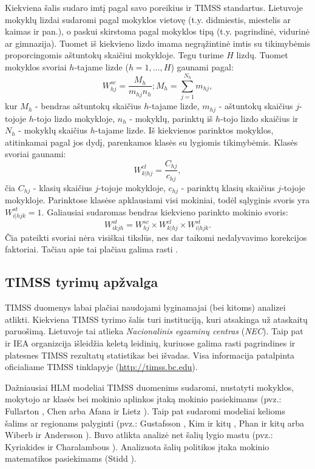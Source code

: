 \documentclass[11pt,a4paper]{article}
\begin{document}
\indent Kiekviena šalis sudaro imtį pagal savo poreikius ir TIMSS standartus. Lietuvoje mokyklų lizdai sudaromi pagal mokyklos vietovę (t.y. didmiestis, miestelis ar kaimas ir pan.), o paskui skirstoma pagal mokyklos tipą (t.y. pagrindinė, vidurinė ar gimnazija). Tuomet iš kiekvieno lizdo imama negrąžintinė imtis su tikimybėmis proporcingomis aštuntokų skaičiui mokykloje. Tegu turime $H$ lizdų. Tuomet mokyklos svoriai $h$-tajame lizde ($h=1,\dots,H$) gaunami pagal:
\begin{equation}
W^{sc}_{hj} = \frac{M_h}{m_{hj}n_h}; M_h=\sum^{N_h}_{j=1} m_{hj},
\end{equation}
kur $M_h$ - bendras aštuntokų skaičius $h$-tajame lizde, $m_{hj}$ - aštuntokų skaičius $j$-tojoje $h$-tojo lizdo mokykloje, $n_h$ - mokyklų, parinktų iš $h$-tojo lizdo skaičius ir $N_h$ - mokyklų skaičius $h$-tajame lizde. Iš kiekvienos parinktos mokyklos, atitinkamai pagal jos dydį, parenkamos klasės su lygiomis tikimybėmis. Klasės svoriai gaunami:
\begin{equation}
W^{cl}_{k|hj} = \frac{C_{hj}}{c_{hj}},
\end{equation}
čia $C_{hj}$ - klasių skaičius $j$-tojoje mokykloje, $c_{hj}$ - parinktų klasių skaičius $j$-tojoje mokykloje. Parinktose klasėse apklausiami visi mokiniai, todėl sąlyginis svoris yra $W^{st}_{i|hjk} = 1$. Galiausiai sudaromas bendras kiekvieno parinkto mokinio svoris:
\begin{equation}
W^{st}_{ikjh} = W^{sc}_{hj}\times W^{cl}_{k|hj}\times W^{st}_{i|hjk}.
\end{equation}
Čia pateikti svoriai nėra visiškai tikslūs, nes dar taikomi nedalyvavimo korekcijos faktoriai. Tačiau apie tai plačiau galima rasti \cite{2011Sample}.

\subsection{TIMSS tyrimų apžvalga}
TIMSS duomenys labai plačiai naudojami lyginamajai (bei kitoms) analizei atlikti. Kiekviena TIMSS tyrimo šalis turi instituciją, kuri atsakinga už ataskaitų paruošimą. Lietuvoje tai atlieka \textit{Nacionalinis egzaminų centras} (\textit{NEC}). Taip pat ir IEA organizcija išleidžia keletą leidinių, kuriuose galima rasti pagrindines ir platesnes TIMSS rezultatų statistikas bei išvadas. Visa informacija patalpinta oficialiame TIMSS tinklapyje (\url{http://timss.bc.edu}).

\indent Dažniausiai HLM modeliai TIMSS duomenims sudaromi, nustatyti mokyklos, mokytojo ar klasės bei mokinio aplinkos įtaką mokinio pasiekimams (pvz.: Fullarton \cite{timssSch1}, Chen \cite{timssSchool2} arba Afana ir Lietz \cite{timssCpalyg1}). Taip pat sudaromi modeliai kelioms šalims ar regionams palyginti (pvz.: Gustafsson \cite{timssCpalyg}, Kim ir kitų \cite{timssCpalyg2}, Phan ir kitų \cite{timssCpalyg3} arba Wiberb ir Andersson \cite{timssCpalyg4}). Buvo atlikta analizė net šalių lygio mastu (pvz.: Kyriakides ir Charalambous \cite{countryHLM}). Analizuota šalių politikos įtaka mokinio matematikos pasiekimams (Stidd \cite{timssPol}).
\end{document}
